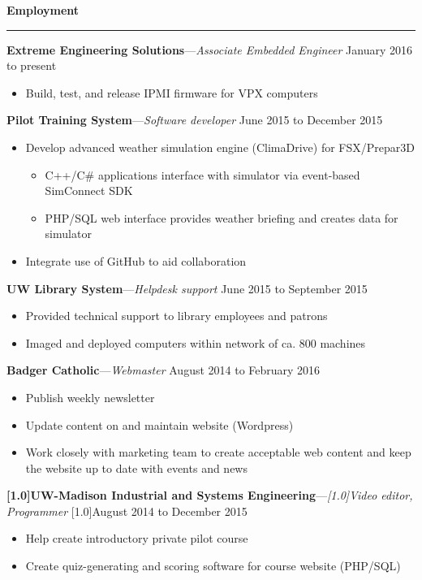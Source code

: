 \documentclass[12pt,letterpaper]{article}
\newenvironment{details}{
    \vspace{-.8em}
    \begin{itemize}
        \renewcommand \labelitemi{\labelitemiv}
        \setlength{\itemsep}{0pt}
        \setlength{\parskip}{-1pt}
        \setlength{\parsep}{0pt}
    }{
    \end{itemize}
    \vspace{-.5em}
}
\newcommand{\hr} {
    \vspace{-1em}
    \par\rule{\textwidth}{1pt}
    \vspace{-1.5em}
}
\newcommand{\ressection}[1] {
    \par{\large \textbf{#1}}
    \hr
}
\newenvironment{employment} {
    \setlength{\parskip}{0pt}
    \ressection{Employment}
}{
    \vspace{0.5em}
}
\newcommand{\employer}[3] {
    \vspace{3pt}
    {\par\textbf{#1}---\textit{#2} \hfill #3}
    \par
}
\begin{document}
\begin{employment} 

\employer{Extreme Engineering Solutions}{Associate Embedded Engineer}{January 2016 to present}
\begin{details}
    \item Build, test, and release IPMI firmware for VPX computers
\end{details}

\employer{Pilot Training System}{Software developer}{June 2015 to December 2015}
\begin{details}
    \item Develop advanced weather simulation engine (ClimaDrive) for FSX/Prepar3D
    \vspace{.5em}
    \begin{details}
        \item C++/C\# applications interface with simulator via event-based SimConnect SDK
        \item PHP/SQL web interface provides weather briefing and creates data for simulator
    \end{details}
    \item Integrate use of GitHub to aid collaboration
\end{details}

\employer{UW Library System}{Helpdesk support}{June 2015 to September 2015}
\begin{details}
    \item Provided technical support to library employees and patrons
    \item Imaged and deployed computers within network of ca. 800 machines
\end{details}

\employer{Badger Catholic}{Webmaster}{August 2014 to February 2016}
\begin{details}
    \item Publish weekly newsletter
    \item Update content on and maintain website (Wordpress)
    \item Work closely with marketing team to create acceptable web content and keep the website up to date with events and news
\end{details}

\employer{\scalebox{.9}[1.0]{UW-Madison Industrial and Systems Engineering}}{\scalebox{.9}[1.0]{Video editor, Programmer}}{\scalebox{.9}[1.0]{August 2014 to December 2015}}
\begin{details}
    \item Help create introductory private pilot course
    \item Create quiz-generating and scoring software for course website (PHP/SQL)
\end{details}


\end{employment}
\end{document}
